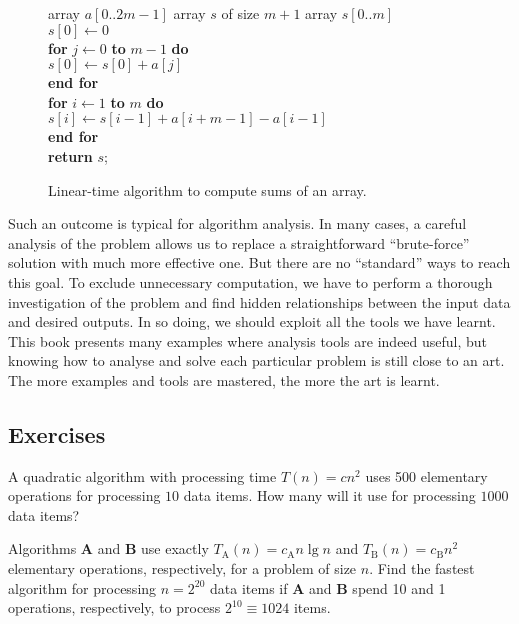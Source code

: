 \begin{figure}[hbtp]
\begin{center}
\begin{minipage}{5in}
{array $a[0..2m-1]$}
{array $s$ of size \(m+1\)}
{
\> array $s[0..m]$\\
\> \(s[0] \leftarrow 0\) \\
\> \textbf{for} \(j \leftarrow  0\) \textbf{to} \(m-1\) \textbf{do}\\
\> \>\(s[0] \leftarrow s[0] + a[j] \) \\
\> \textbf{end for} \\
\> \textbf{for} \(i \leftarrow  1\) \textbf{to} \(m\) \textbf{do}\\
\> \>\(s[i] \leftarrow s[i-1] + a[i+m-1]- a[i-1] \) \\
\> \textbf{end for} \\
\> \textbf{return} $s$;\\
}
\end{minipage}
\end{center}
\caption{Linear-time algorithm to compute sums of an array.}
\label{fig:alg-good-array-sum}
\end{figure}

Such an outcome is typical for algorithm analysis. In many cases, a
careful analysis of the problem allows us to replace a straightforward
``brute-force'' solution with much more effective one. But there are no
``standard'' ways to reach this goal. To exclude unnecessary
computation, we have to perform a thorough investigation of the problem
and find hidden relationships between the input data and desired
outputs. In so doing, we should exploit  all the tools we have learnt.
This book presents many examples where analysis tools are indeed useful,
but knowing how to analyse and solve each particular problem is still close to
an art. The more examples and tools are mastered, the more the art is
learnt. 

\subsection*{Exercises}

\begin{Exercise}
\label{exr:time-compl:2}
A quadratic algorithm with processing time \(T(n)=cn^2 \)
uses 500 elementary operations for processing $10$ data items. How many will it 
use for processing $1000$ data items? 
\end{Exercise}


\begin{Exercise}
\label{exr:time-compl:7A}
Algorithms \textbf{A} and 
\textbf{B} use
exactly \(T_\mathrm{A}(n) = c_\mathrm{A} n \lg n\)
and \(T_\mathrm{B}(n) = c_\mathrm{B} n^{2}\) elementary operations, 
respectively, for a problem of size \(n\).
Find the fastest algorithm for processing \(n=2^{20}\) data items if
\textbf{A} and \textbf{B} spend 10 and 1 operations,
respectively, to process \(2^{10}\equiv 1024\) items.
\end{Exercise}


